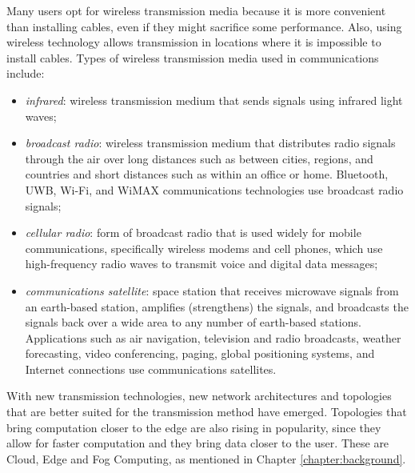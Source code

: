 		Many users opt for wireless transmission media because it is more convenient than installing cables, even if they might sacrifice some performance. 
		Also, using wireless technology allows transmission in locations where it is impossible to install cables.
		Types of wireless transmission media used in communications include:
		\begin{itemize}
			\item \textit{infrared}: wireless transmission medium that sends signals using infrared light waves;
			\item \textit{broadcast radio}: wireless transmission medium that distributes radio signals through the air over long distances such as between cities, regions, and countries and short distances such as within an office or home.
			Bluetooth, UWB, Wi-Fi, and WiMAX communications technologies use broadcast radio signals;
			\item \textit{cellular radio}: form of broadcast radio that is used widely for mobile communications, specifically wireless modems and cell phones, which use high-frequency radio waves to transmit voice and digital data messages;
			\item \textit{communications satellite}: space station that receives microwave signals from an earth-based station, amplifies (strengthens) the signals, and broadcasts the signals back over a wide area to any number of earth-based stations.
			Applications such as air navigation, television and radio broadcasts, weather forecasting, video conferencing, paging, global positioning systems, and Internet connections use communications satellites.
		\end{itemize}
		
		With new transmission technologies, new network architectures and topologies that are better suited for the transmission method have emerged.
		Topologies that bring computation closer to the edge are also rising in popularity, since they allow for faster computation and they bring data closer to the user.
		These are Cloud, Edge and Fog Computing, as mentioned in Chapter \ref{chapter:background}.
		
